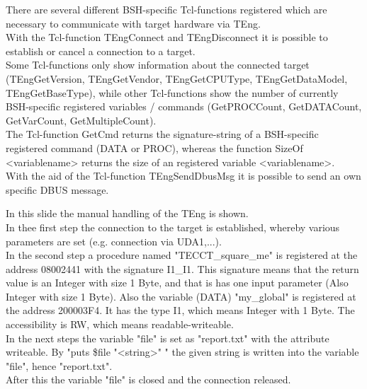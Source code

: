 There are several different BSH-specific Tcl-functions registered which are necessary to communicate with target hardware via TEng.
\\
With the Tcl-function TEngConnect and TEngDisconnect it is possible to establish or cancel a connection to a target.
\\
Some Tcl-functions only show information about the connected target (TEngGetVersion, TEngGetVendor, TEngGetCPUType, TEngGetDataModel, TEngGetBaseType), while other Tcl-functions show the number of currently BSH-specific registered variables / commands (GetPROCCount, GetDATACount, GetVarCount, GetMultipleCount).
\\
The Tcl-function GetCmd returns the signature-string of a BSH-specific registered command (DATA or PROC), whereas the function SizeOf <variablename> returns the size of an registered variable <variablename>.
\\
With the aid of the Tcl-function TEngSendDbusMsg it is possible to send an own specific DBUS message.









In this slide the manual handling of the TEng is shown.
\\
In thee first step the connection to the target is established, whereby various parameters are set (e.g. connection via UDA1,...).
\\
In the second step a procedure named "TECCT\_square\_me" is registered at the address 08002441 with the signature I1\_I1. This signature means that the return value is an Integer with size 1 Byte, and that is has one input parameter (Also Integer with size 1 Byte).
Also the variable (DATA) "my\_global" is registered at the address 200003F4. It has the type I1, which means Integer with 1 Byte. The accessibility is RW, which means readable-writeable.
\\
In the next steps the variable "file" is set as "report.txt" with the attribute writeable. By "puts \$file "<string>" " the given string is written into the variable "file", hence "report.txt".
\\
After this the variable "file" is closed and the connection released.






